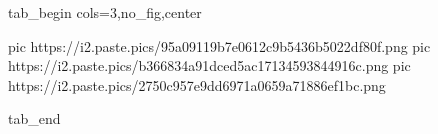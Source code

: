  
 
 
 
 


\ifcmt
  tab_begin cols=3,no_fig,center

     pic https://i2.paste.pics/95a09119b7e0612c9b5436b5022df80f.png
		 pic https://i2.paste.pics/b366834a91dced5ac17134593844916c.png
		 pic https://i2.paste.pics/2750c957e9dd6971a0659a71886ef1bc.png

  tab_end
\fi
